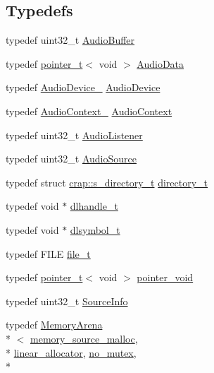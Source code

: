 \subsection*{Typedefs}
\begin{DoxyCompactItemize}
\item 
typedef uint32\+\_\+t \hyperlink{namespacecrap_a90f6b78604f0bc004080819aa4691107}{Audio\+Buffer}
\item 
typedef \hyperlink{structcrap_1_1pointer__t}{pointer\+\_\+t}$<$ void $>$ \hyperlink{namespacecrap_a0566c0c5049ce39b01856c01d2669f2c}{Audio\+Data}
\item 
typedef \hyperlink{audiodevice_8h_a13d8d739d6146ae8460383745ad22318}{Audio\+Device\+\_\+} \hyperlink{namespacecrap_a0554191481198902f832204ecc2db4c0}{Audio\+Device}
\item 
typedef \hyperlink{audiodevice_8h_a1aaee345eede00e723229ae1e895e0a7}{Audio\+Context\+\_\+} \hyperlink{namespacecrap_a4d9ca11977af369032d36460bc1c80e7}{Audio\+Context}
\item 
typedef uint32\+\_\+t \hyperlink{namespacecrap_a73b9ecbfa0198e8a702c3569958e1653}{Audio\+Listener}
\item 
typedef uint32\+\_\+t \hyperlink{namespacecrap_a462d678db37c6a434145136ab6d59720}{Audio\+Source}
\item 
typedef struct \hyperlink{structcrap_1_1s__directory__t}{crap\+::s\+\_\+directory\+\_\+t} \hyperlink{namespacecrap_a82911918170604f7fc9e93d66891069c}{directory\+\_\+t}
\item 
typedef void $\ast$ \hyperlink{namespacecrap_acee8e66495f007816233ce6b2da6465b}{dlhandle\+\_\+t}
\item 
typedef void $\ast$ \hyperlink{namespacecrap_a2eba1ed085b0da868a3cd8b2d6a4f7e7}{dlsymbol\+\_\+t}
\item 
typedef F\+I\+L\+E \hyperlink{namespacecrap_afd3eedf00a9de7958b7dd70aafff79a4}{file\+\_\+t}
\item 
typedef \hyperlink{structcrap_1_1pointer__t}{pointer\+\_\+t}$<$ void $>$ \hyperlink{namespacecrap_aa4cb82451ede6b73c49d862af29aebb3}{pointer\+\_\+void}
\item 
typedef uint32\+\_\+t \hyperlink{namespacecrap_acad6ca15596aab071175697e764086bb}{Source\+Info}
\item 
typedef \hyperlink{classcrap_1_1_memory_arena}{Memory\+Arena}\\*
$<$ \hyperlink{classcrap_1_1memory__source__malloc}{memory\+\_\+source\+\_\+malloc}, \\*
\hyperlink{classcrap_1_1linear__allocator}{linear\+\_\+allocator}, \hyperlink{structcrap_1_1no__mutex}{no\+\_\+mutex}, \\*

\end{DoxyCompactItemize}
